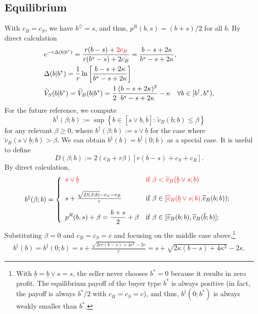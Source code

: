\subsection{Equilibrium}
With $c_B=c_S$, we have $b^\diamondsuit=s$, and thus, 
$p^R(b,s) = ({b+s})/{2}$ for all  $b$. By direct calculation  
    \begin{align*}
    &e^{-r\Delta (b|b^*)}
    =\frac{r(b-s)+{\color{red} 2c_B}}{r(b^*-s)+{2c_B}}=\frac{b-s+2\kappa}{b^*-s+2\kappa},
    \\
   &
    \Delta(b|b^*) = \frac{1}{r} \ln \left[\frac{b-s+2\kappa}{b^*-s+2\kappa}\right]
    \\
    &\widetilde V_S (b|b^*)=\widetilde V_B (b|b^*)=\frac{1}{2}\frac{(b-s+2\kappa)^2}{{b^*}-s+2\kappa}-\kappa \quad\forall b\in[b^\dagger, b^*),
    \end{align*}
For the future reference, we compute
	$$
	b^\ddagger(\beta;b):=
    \sup\left\{
	{b\in[s\vee \underline b, \overline b]}:\, 
    \widetilde v_B (b;b)\leq \beta \right\} 
    $$
for any relevant $\beta\geq 0$, where $b^\ddagger(\beta;b):=s\vee \underline b$ for the case where $\widetilde v_B (s \vee \underline b;b)> \beta$. We can obtain $b^\ddagger(b)=b^\ddagger(0;b)$ as a special case. It is useful to define 
    $$
    D(\beta;b):=2(c_B+r\beta)[r(b-s)+c_S+c_B].
    $$
By direct calculation, 
   \begin{align*}
    b^\ddagger(\beta;b)
    =\left\{
    \begin{array}{ll}
    \displaystyle 
    \color{red}s\vee\underline b & \text{\color{red} if $\beta<\widetilde v_B(\underline b\vee s;b)$}
    \\[10pt]
    s+\frac{\sqrt{D(\beta;b)}-c_S-c_B}{r}
    &\text{if $\beta\in[{\color{red}\widetilde v_B(\underline b\vee s;b),} \widetilde v_B (b;b))$;}
    \\[10pt]
    \displaystyle 
    p^R(b,s) + \beta = \frac{b+s}{2} +\beta &\text{if $\beta\in[\widetilde v_B (b;b),\widetilde v_B (\overline b;b)]$;}
    \end{array} 
    \right.
	\end{align*}
Substituting $\beta=0$ and $c_B=c_S=c$ {\color{red}and focusing on the middle case above},\footnote{With $\underline b=\underline b \vee s =s$, the seller never chooses $b^*=0$ because it results in zero profit. The equilibrium payoff of the buyer type $b^*$ is always positive (in fact, the payoff is always $b^*/2$ with $c_B=c_S=c$), and thus, $b^\ddagger(0;b^*)$ is always weakly smaller than $b^*$.}
    \begin{align*}
    b^\ddagger(b) = b^\ddagger(0;b)
    =s+\frac{\sqrt{2cr(b-s)+4c^2}-2c}{r}
    =s+\sqrt{2\kappa(b-s)+4\kappa^2}-2\kappa. 
    \end{align*}

